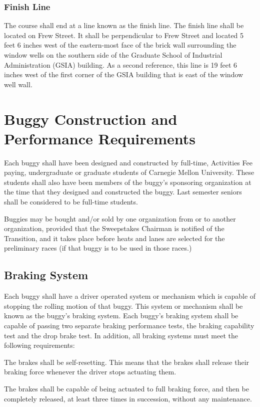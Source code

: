 \documentclass[openany]{book}
\begin{document}
\subsection{Finish Line}

The course shall end at a line known as the finish line. The finish line shall be located on Frew Street. It shall be perpendicular to Frew Street and located 5 feet 6 inches west of the eastern-most face of the brick wall surrounding the window wells on the southern side of the Graduate School of Industrial Administration (GSIA) building. As a second reference, this line is 19 feet 6 inches west of the first corner of the GSIA building that is east of the window well wall.

\chapter{Buggy Construction and Performance Requirements}

Each buggy shall have been designed and constructed by full-time, Activities Fee paying, undergraduate or graduate students of Carnegie Mellon University. These students shall also have been members of the buggy's sponsoring organization at the time that they designed and constructed the buggy. Last semester seniors shall be considered to be full-time students.

Buggies may be bought and/or sold by one organization from or to another organization, provided that the Sweepstakes Chairman is notified of the Transition, and it takes place before heats and lanes are selected for the preliminary races (if that buggy is to be used in those races.)

\section{Braking System}

Each buggy shall have a driver operated system or mechanism which is capable of stopping the rolling motion of that buggy. This system or mechanism shall be known as the buggy's braking system. Each buggy's braking system shall be capable of passing two separate braking performance tests, the braking capability test and the drop brake test. In addition, all braking systems must meet the following requirements:

The brakes shall be self-resetting. This means that the brakes shall release their braking force whenever the driver stops actuating them.

The brakes shall be capable of being actuated to full braking force, and then be completely released, at least three times in succession, without any maintenance.
\end{document}
